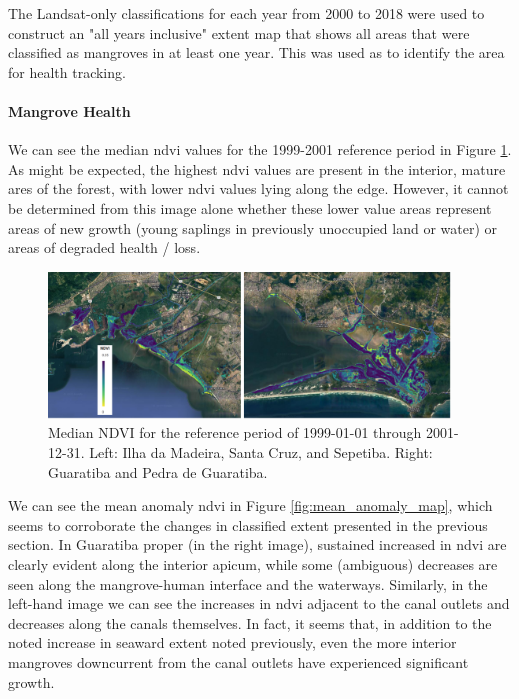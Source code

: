 The Landsat-only classifications for each year from 2000 to 2018 were used to construct an "all years inclusive" extent map that shows all areas that were classified as mangroves in at least one year. This was used as to identify the area for health tracking.

\paragraph{Mangrove Health} \leavevmode\newline

We can see the median \ac{ndvi} values for the 1999-2001 reference period in Figure \ref{fig:reference_median}. As might be expected, the highest \ac{ndvi} values are present in the interior, mature ares of the forest, with lower \ac{ndvi} values lying along the edge. However, it cannot be determined from this image alone whether these lower value areas represent areas of new growth (young saplings in previously unoccupied land or water) or areas of degraded health / loss.  

\begin{figure}[!htb] 
\centering
\includegraphics[width=0.95\textwidth]{Figures/chap4/reference_median.png}
\caption[Reference Median NDVI of Region]{Median NDVI for the reference period of 1999-01-01 through 2001-12-31. Left: Ilha da Madeira, Santa Cruz, and Sepetiba. Right: Guaratiba and Pedra de Guaratiba.}
\label{fig:reference_median}
\end{figure}

We can see the mean anomaly \ac{ndvi} in Figure \ref{fig:mean_anomaly_map}, which seems to corroborate the changes in classified extent presented in the previous section. In Guaratiba proper (in the right image), sustained increased in \ac{ndvi} are clearly evident along the interior apicum, while some (ambiguous) decreases are seen along the mangrove-human interface and the waterways. Similarly, in the left-hand image we can see the increases in \ac{ndvi} adjacent to the canal outlets and decreases along the canals themselves. In fact, it seems that, in addition to the noted increase in seaward extent noted previously, even the more interior mangroves downcurrent from the canal outlets have experienced significant growth. 

